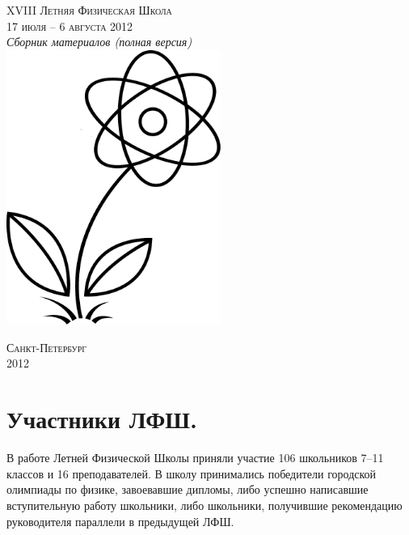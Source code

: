 \documentclass[12pt]{article}
\newlength{\h}
\newlength{\x}
\begin{document}
\thispagestyle{empty}
\parindent=5mm
\begin{center}

\phantom{Бухалкин апанас}

\vfill
\LARGE{\textsc{XVIII Летняя Физическая Школа}}\\
\Large{\textsc{17 июля -- 6 августа 2012}}\\[1cm]
\Large{\textit{Сборник материалов (полная версия)}}\\[2cm]
\includegraphics[width=7cm]{./logo2012.pdf}
\vfill

\small{\textsc{Санкт-Петербург}\\
\textsc{2012}}
\end{center}

\clearpage

\hypersetup{colorlinks,%
  linkcolor=black
}

\tableofcontents

\hypersetup{colorlinks,%
  citecolor=blue,
  urlcolor=blue,
  linkcolor=red
}

\clearpage

\section{Участники ЛФШ. }
\label{sec:participants}

В работе Летней Физической Школы приняли участие 106 школьников 7--11
классов и 16 преподавателей. В школу принимались победители городской
олимпиады по физике, завоевавшие дипломы, либо успешно написавшие
вступительную работу школьники, либо школьники, получившие
рекомендацию руководителя параллели в предыдущей ЛФШ.
\end{document}
